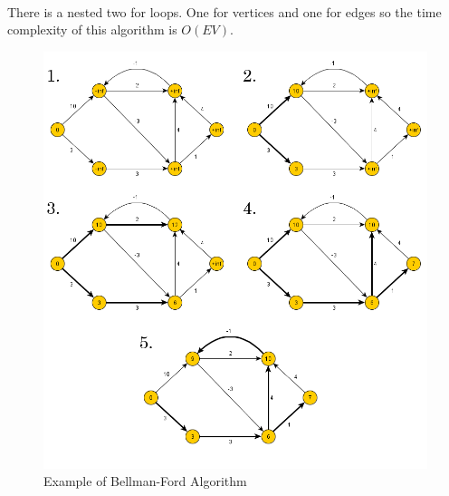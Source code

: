 \documentclass[12pt]{article}
\begin{document}
\paragraph{} There is a nested two for loops. One for vertices and one for edges so the time complexity of this algorithm is $O(EV)$. 
\begin{figure}[h!]
\begin{center}
\includegraphics[width=\linewidth/3]{bellman.png}
  \end{center}
\caption{ Example of Bellman-Ford Algorithm }
  \label{fig}
\end{figure}
\newpage
\end{document}
